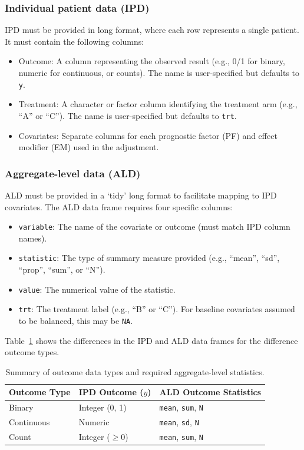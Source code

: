 \documentclass[article]{jss}
\begin{document}
\subsubsection{Individual patient data (IPD)}
IPD must be provided in long format, where each row represents a single patient. It must contain the following columns:
\begin{itemize}
    \item Outcome: A column representing the observed result (e.g., 0/1 for binary, numeric for continuous, or counts). The name is user-specified but defaults to \texttt{y}.
    \item Treatment: A character or factor column identifying the treatment arm (e.g., ``A'' or ``C''). The name is user-specified but defaults to \texttt{trt}.
    \item Covariates: Separate columns for each prognostic factor (PF) and effect modifier (EM) used in the adjustment.
\end{itemize}

\subsubsection{Aggregate-level data (ALD)}
ALD must be provided in a `tidy' long format to facilitate mapping to IPD covariates. The ALD data frame requires four specific columns:
\begin{itemize}
    \item \texttt{variable}: The name of the covariate or outcome (must match IPD column names).
    \item \texttt{statistic}: The type of summary measure provided (e.g., ``mean'', ``sd'', ``prop'', ``sum'', or ``N'').
    \item \texttt{value}: The numerical value of the statistic.
    \item \texttt{trt}: The treatment label (e.g., ``B'' or ``C''). For baseline covariates assumed to be balanced, this may be \texttt{NA}.
\end{itemize}

Table~\ref{tab:outcome_data_summary} shows the differences in the IPD and ALD data frames for the difference outcome types.

\begin{table}[h!]
\centering
\caption{Summary of outcome data types and required aggregate-level statistics.}
\label{tab:outcome_data_summary}
\begin{tabular}{lll}
\hline
\textbf{Outcome Type} & \textbf{IPD Outcome ($y$)} & \textbf{ALD Outcome Statistics} \\ \hline
Binary & Integer (0, 1) & \texttt{mean}, \texttt{sum}, \texttt{N} \\
Continuous & Numeric & \texttt{mean}, \texttt{sd}, \texttt{N} \\
Count & Integer ($\ge 0$) & \texttt{mean}, \texttt{sum}, \texttt{N} \\ \hline
\end{tabular}
\end{table}
\end{document}
